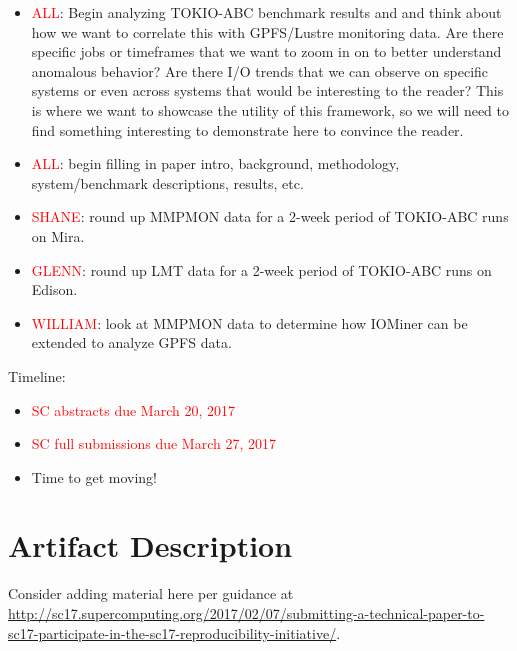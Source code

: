 \documentclass[conference,10pt,compsocconf]{IEEEtran}
\begin{document}
\begin{itemize}
    \item \textcolor{red}{ALL}: Begin analyzing TOKIO-ABC benchmark results and
    and think about how we want to correlate this with GPFS/Lustre monitoring
    data. Are there specific jobs or timeframes that we want to zoom in on
    to better understand anomalous behavior? Are there I/O trends that we
    can observe on specific systems or even across systems that would be
    interesting to the reader? This is where we want to showcase the utility
    of this framework, so we will need to find something interesting to demonstrate
    here to convince the reader. 

    \item \textcolor{red}{ALL}: begin filling in paper intro, background,
    methodology, system/benchmark descriptions, results, etc.

    \item \textcolor{red}{SHANE}: round up MMPMON data for a 2-week period
    of TOKIO-ABC runs on Mira.

    \item \textcolor{red}{GLENN}: round up LMT data for a 2-week period of
    TOKIO-ABC runs on Edison.

    \item \textcolor{red}{WILLIAM}: look at MMPMON data to determine how
    IOMiner can be extended to analyze GPFS data. 
\end{itemize}

Timeline:
\begin{itemize}
    \item \textcolor{red}{SC abstracts due March 20, 2017}
    \item \textcolor{red}{SC full submissions due March 27, 2017}
    \item Time to get moving!
\end{itemize}




\appendix

\section{Artifact Description}

Consider adding material here per guidance at
\url{http://sc17.supercomputing.org/2017/02/07/submitting-a-technical-paper-to-sc17-participate-in-the-sc17-reproducibility-initiative/}.
\end{document}
